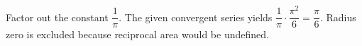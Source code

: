 Factor out the constant $\dfrac{1}{\pi}$. The given convergent series yields $\dfrac{1}{\pi}\cdot\dfrac{\pi^2}{6}=\boxed{\dfrac{\pi}{6}}$. Radius zero is excluded because reciprocal area would be undefined.

